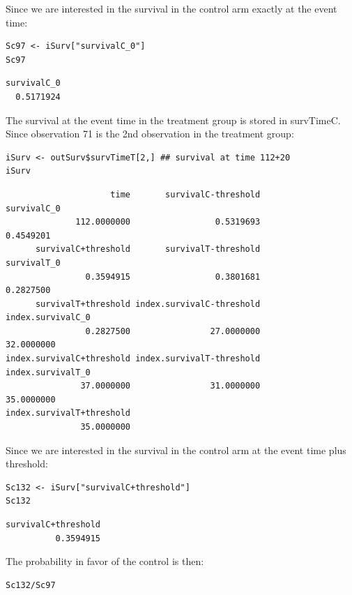 \documentclass[12pt]{article}
\begin{document}
Since we are interested in the survival in the control arm exactly at the event time:
\lstset{language=r,label= ,caption= ,captionpos=b,numbers=none}
\begin{lstlisting}
Sc97 <- iSurv["survivalC_0"] 
Sc97
\end{lstlisting}

\begin{verbatim}
survivalC_0 
  0.5171924
\end{verbatim}


The survival at the event time in the treatment group is stored in
survTimeC. Since observation 71 is the 2nd observation in the treatment
group:
\lstset{language=r,label= ,caption= ,captionpos=b,numbers=none}
\begin{lstlisting}
iSurv <- outSurv$survTimeT[2,] ## survival at time 112+20
iSurv
\end{lstlisting}

\begin{verbatim}
                     time       survivalC-threshold               survivalC_0 
              112.0000000                 0.5319693                 0.4549201 
      survivalC+threshold       survivalT-threshold               survivalT_0 
                0.3594915                 0.3801681                 0.2827500 
      survivalT+threshold index.survivalC-threshold         index.survivalC_0 
                0.2827500                27.0000000                32.0000000 
index.survivalC+threshold index.survivalT-threshold         index.survivalT_0 
               37.0000000                31.0000000                35.0000000 
index.survivalT+threshold 
               35.0000000
\end{verbatim}

Since we are interested in the survival in the control arm at the event time plus threshold:
\lstset{language=r,label= ,caption= ,captionpos=b,numbers=none}
\begin{lstlisting}
Sc132 <- iSurv["survivalC+threshold"] 
Sc132
\end{lstlisting}

\begin{verbatim}
survivalC+threshold 
          0.3594915
\end{verbatim}


The probability in favor of the control is then:
\lstset{language=r,label= ,caption= ,captionpos=b,numbers=none}
\begin{lstlisting}
Sc132/Sc97
\end{lstlisting}
\end{document}
